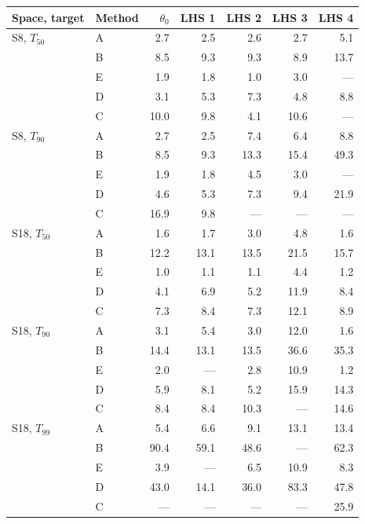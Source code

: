 \begin{tabular}{llrrrrr}\toprule
Space, target & Method & $\theta_0$ & LHS 1 & LHS 2 & LHS 3 & LHS 4\\\midrule
S8, $T_{50}$ & A & 2.7 & 2.5 & 2.6 & 2.7 & 5.1\\
 & B & 8.5 & 9.3 & 9.3 & 8.9 & 13.7\\
 & E & 1.9 & 1.8 & 1.0 & 3.0 & ---\\
 & D & 3.1 & 5.3 & 7.3 & 4.8 & 8.8\\
 & C & 10.0 & 9.8 & 4.1 & 10.6 & ---\\
\addlinespace
S8, $T_{90}$ & A & 2.7 & 2.5 & 7.4 & 6.4 & 8.8\\
 & B & 8.5 & 9.3 & 13.3 & 15.4 & 49.3\\
 & E & 1.9 & 1.8 & 4.5 & 3.0 & ---\\
 & D & 4.6 & 5.3 & 7.3 & 9.4 & 21.9\\
 & C & 16.9 & 9.8 & --- & --- & ---\\
\addlinespace
S18, $T_{50}$ & A & 1.6 & 1.7 & 3.0 & 4.8 & 1.6\\
 & B & 12.2 & 13.1 & 13.5 & 21.5 & 15.7\\
 & E & 1.0 & 1.1 & 1.1 & 4.4 & 1.2\\
 & D & 4.1 & 6.9 & 5.2 & 11.9 & 8.4\\
 & C & 7.3 & 8.4 & 7.3 & 12.1 & 8.9\\
\addlinespace
S18, $T_{90}$ & A & 3.1 & 5.4 & 3.0 & 12.0 & 1.6\\
 & B & 14.4 & 13.1 & 13.5 & 36.6 & 35.3\\
 & E & 2.0 & --- & 2.8 & 10.9 & 1.2\\
 & D & 5.9 & 8.1 & 5.2 & 15.9 & 14.3\\
 & C & 8.4 & 8.4 & 10.3 & --- & 14.6\\
\addlinespace
S18, $T_{99}$ & A & 5.4 & 6.6 & 9.1 & 13.1 & 13.4\\
 & B & 90.4 & 59.1 & 48.6 & --- & 62.3\\
 & E & 3.9 & --- & 6.5 & 10.9 & 8.3\\
 & D & 43.0 & 14.1 & 36.0 & 83.3 & 47.8\\
 & C & --- & --- & --- & --- & 25.9\\
\bottomrule\end{tabular}
